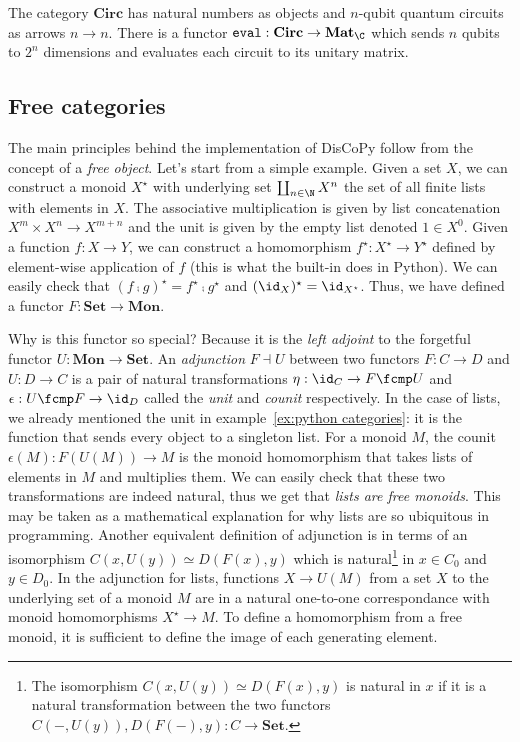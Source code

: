 \begin{example}
The category $\mathbf{Circ}$ has natural numbers as objects and $n$-qubit quantum circuits as arrows $n \to n$.
There is a functor $\mathtt{eval} : \mathbf{Circ} \to \mathbf{Mat}_\C$ which sends $n$ qubits to $2^n$ dimensions and evaluates each circuit to its unitary matrix.
\end{example}

\subsection{Free categories}

The main principles behind the implementation of DisCoPy follow from the concept of a \emph{free object}.
Let's start from a simple example.
Given a set $X$, we can construct a monoid $X^\star$ with underlying set $\coprod_{n \in \N} X^n$ the set of all finite lists with elements in $X$.
The associative multiplication is given by list concatenation $X^m \times X^n \to X^{m + n}$ and the unit is given by the empty list denoted $1 \in X^0$.
Given a function $f : X \to Y$, we can construct a homomorphism $f^\star : X^\star \to Y^\star$ defined by element-wise application of $f$ (this is what the built-in  does in Python).
We can easily check that $(f \fcmp g)^\star = f^\star \fcmp g^\star$ and $(\id_X)^\star = \id_{X^\star}$.
Thus, we have defined a functor $F : \mathbf{Set} \to \mathbf{Mon}$.

Why is this functor so special? Because it is the \emph{left adjoint} to the forgetful functor $U : \mathbf{Mon} \to \mathbf{Set}$.
An \emph{adjunction} $F \dashv U$ between two functors $F : C \to D$ and $U : D \to C$ is a pair of natural transformations $\eta : \id_C \to F \fcmp U$ and $\epsilon : U \fcmp F \to \id_D$ called the \emph{unit} and \emph{counit} respectively.
In the case of lists, we already mentioned the unit in example~\ref{ex:python categories}: it is the function that sends every object to a singleton list.
For a monoid $M$, the counit $\epsilon(M) : F(U(M)) \to M$ is the monoid homomorphism that takes lists of elements in $M$ and multiplies them.
We can easily check that these two transformations are indeed natural, thus we get that \emph{lists are free monoids}.
This may be taken as a mathematical explanation for why lists are so ubiquitous in programming.
Another equivalent definition of adjunction is in terms of an isomorphism $C(x, U(y)) \simeq D(F(x), y)$ which is natural\footnote
{The isomorphism $C(x, U(y)) \simeq D(F(x), y)$ is natural in $x$ if it is a natural transformation between the two functors $C(-, U(y)), D(F(-), y) : C \to \mathbf{Set}$.}
in $x \in C_0$ and $y \in D_0$.
In the adjunction for lists, functions $X \to U(M)$ from a set $X$ to the underlying set of a monoid $M$ are in a natural one-to-one correspondance with monoid homomorphisms $X^\star \to M$.
To define a homomorphism from a free monoid, it is sufficient to define the image of each generating element.

